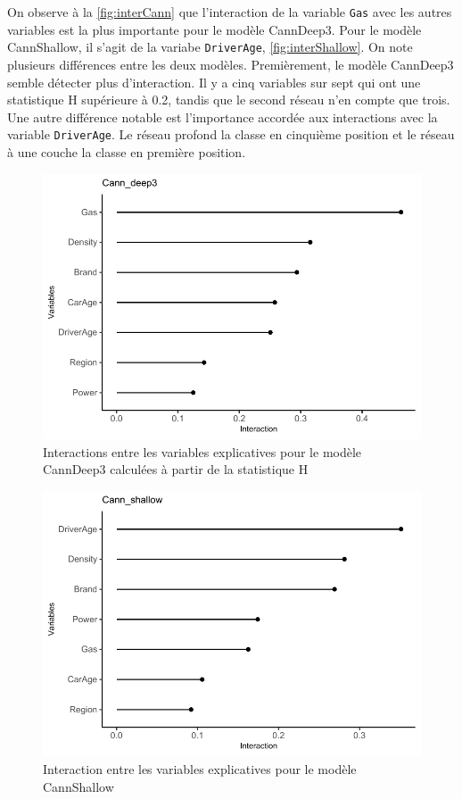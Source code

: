 \begin{figure}
\begin{minipage}{0.45\linewidth}
\end{minipage}
\end{figure}


On observe à la \autoref{fig:interCann} que l'interaction de la variable \verb=Gas= avec les autres variables est la plus importante pour le modèle CannDeep3. Pour le modèle CannShallow, il s'agit de la variabe \verb=DriverAge=, \autoref{fig:interShallow}. On note plusieurs différences entre les deux modèles. Premièrement, le modèle CannDeep3 semble détecter plus d'interaction. Il y a cinq variables sur sept qui ont une statistique H supérieure à 0.2, tandis que le second réseau n'en compte que trois. Une autre différence notable est l'importance accordée aux interactions avec la variable \verb=DriverAge=. Le réseau profond la classe en cinquième position et le réseau à une couche la classe en première position. 


\begin{figure}
\centering
\caption{\label{fig:interCann} Interactions entre les variables explicatives pour le modèle CannDeep3 calculées à partir de la statistique H}
\includegraphics[scale=0.9]{Graphiques/interCann}
\end{figure}


\begin{figure}
\centering
\caption{\label{fig:interShallow} Interaction entre les variables explicatives pour le modèle CannShallow }
\includegraphics[scale=0.9]{Graphiques/interShallow}
\end{figure}

